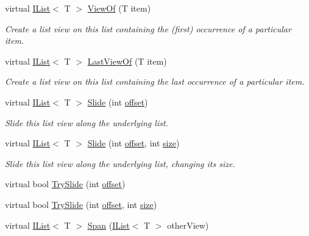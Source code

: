 \begin{DoxyCompactItemize}
virtual \hyperlink{interface_c5_1_1_i_list}{I\+List}$<$ T $>$ \hyperlink{class_c5_1_1_array_list_ae51aa95d71cfbf4ac68610d6285a308e}{View\+Of} (T item)
\begin{DoxyCompactList}\small\item\em Create a list view on this list containing the (first) occurrence of a particular item. \end{DoxyCompactList}\item 
virtual \hyperlink{interface_c5_1_1_i_list}{I\+List}$<$ T $>$ \hyperlink{class_c5_1_1_array_list_a501ef3474fc833061931a134daa2cab2}{Last\+View\+Of} (T item)
\begin{DoxyCompactList}\small\item\em Create a list view on this list containing the last occurrence of a particular item. \end{DoxyCompactList}\item 
virtual \hyperlink{interface_c5_1_1_i_list}{I\+List}$<$ T $>$ \hyperlink{class_c5_1_1_array_list_ae3a767b85e9ce23fadec95048a265bf4}{Slide} (int \hyperlink{class_c5_1_1_array_base_a2fff33ea372907c015262a3041b2f2af}{offset})
\begin{DoxyCompactList}\small\item\em Slide this list view along the underlying list. \end{DoxyCompactList}\item 
virtual \hyperlink{interface_c5_1_1_i_list}{I\+List}$<$ T $>$ \hyperlink{class_c5_1_1_array_list_ab20264e4ddd5209180c5d352ab85a17f}{Slide} (int \hyperlink{class_c5_1_1_array_base_a2fff33ea372907c015262a3041b2f2af}{offset}, int \hyperlink{class_c5_1_1_collection_base_ab524b118754a5a8290b6528511272833}{size})
\begin{DoxyCompactList}\small\item\em Slide this list view along the underlying list, changing its size. \end{DoxyCompactList}\item 
virtual bool \hyperlink{class_c5_1_1_array_list_adac943600e590e256dc302cb985e9e28}{Try\+Slide} (int \hyperlink{class_c5_1_1_array_base_a2fff33ea372907c015262a3041b2f2af}{offset})
\item 
virtual bool \hyperlink{class_c5_1_1_array_list_ae36f7c07dba092711b1a2a0068d54619}{Try\+Slide} (int \hyperlink{class_c5_1_1_array_base_a2fff33ea372907c015262a3041b2f2af}{offset}, int \hyperlink{class_c5_1_1_collection_base_ab524b118754a5a8290b6528511272833}{size})
\item 
virtual \hyperlink{interface_c5_1_1_i_list}{I\+List}$<$ T $>$ \hyperlink{class_c5_1_1_array_list_ac28db3fe49e52107a54e7a33dabb67c2}{Span} (\hyperlink{interface_c5_1_1_i_list}{I\+List}$<$ T $>$ other\+View)

\end{DoxyCompactItemize}
